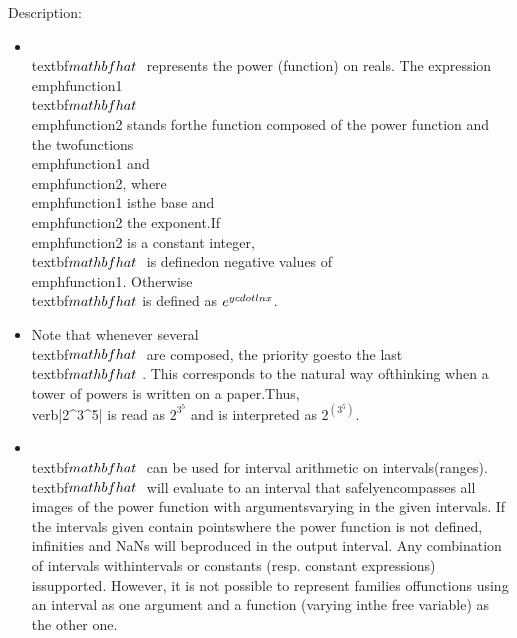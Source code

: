 \noindent Description: \begin{itemize}

\item \\textbf{$\\mathbf{\\hat{~}}$} represents the power (function) on reals. \n   The expression \\emph{function1} \\textbf{$\\mathbf{\\hat{~}}$} \\emph{function2} stands for\n   the function composed of the power function and the two\n   functions \\emph{function1} and \\emph{function2}, where \\emph{function1} is\n   the base and \\emph{function2} the exponent.\n   If \\emph{function2} is a constant integer, \\textbf{$\\mathbf{\\hat{~}}$} is defined\n   on negative values of \\emph{function1}. Otherwise \\textbf{$\\mathbf{\\hat{~}}$}\n   is defined as $e^{y \\cdot \\ln x}$.\n
\item Note that whenever several \\textbf{$\\mathbf{\\hat{~}}$} are composed, the priority goes\n   to the last \\textbf{$\\mathbf{\\hat{~}}$}. This corresponds to the natural way of\n   thinking when a tower of powers is written on a paper.\n   Thus, \\verb|2^3^5| is read as $2^{3^5}$ and is interpreted as $2^{(3^5)}$.\n
\item \\textbf{$\\mathbf{\\hat{~}}$} can be used for interval arithmetic on intervals\n   (ranges). \\textbf{$\\mathbf{\\hat{~}}$} will evaluate to an interval that safely\n   encompasses all images of the power function with arguments\n   varying in the given intervals. If the intervals given contain points\n   where the power function is not defined, infinities and NaNs will be\n   produced in the output interval.  Any combination of intervals with\n   intervals or constants (resp. constant expressions) is\n   supported. However, it is not possible to represent families of\n   functions using an interval as one argument and a function (varying in\n   the free variable) as the other one.\n\end{itemize}
